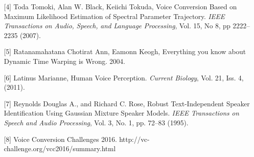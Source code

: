 \documentclass{article}
\begin{document}
[4] Toda Tomoki, Alan W. Black, Keiichi Tokuda, Voice Conversion Based on Maximum Likelihood Estimation of Spectral Parameter Trajectory. {\it IEEE Transactions on Audio, Speech, and Language Processing}, Vol. 15, No 8, pp 2222--2235 (2007). 
 
[5] Ratanamahatana Chotirat Ann, Eamonn Keogh, Everything you know about Dynamic Time Warping is Wrong. 2004. 
 
[6] Latinus Marianne, Human Voice Perception. {\it Current Biology}, Vol. 21, Iss. 4, (2011). 
 
[7] Reynolds Douglas A., and Richard C. Rose, Robust Text-Independent Speaker Identification Using Gaussian Mixture Speaker Models. {\it IEEE Transactions on Speech and Audio Processing}, Vol. 3, No. 1, pp. 72--83 (1995).

[8] Voice Conversion Challenges 2016. http://vc-challenge.org/vcc2016/summary.html
\end{document}
